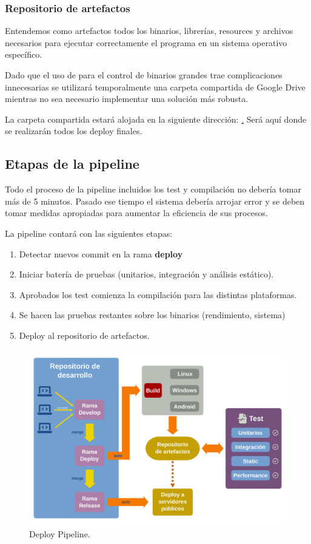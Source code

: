 \subsubsection{Repositorio de artefactos}

Entendemos como artefactos todos los binarios, librerías, resources y archivos necesarios para ejecutar correctamente el programa en un sistema operativo específico.

Dado que el uso de  para el control de binarios grandes trae complicaciones innecesarias se utilizará temporalmente una carpeta compartida de Google Drive mientras no sea necesario implementar una solución más robusta.

La carpeta compartida estará alojada en la siguiente dirección: \href{https://drive.google.com/drive/folders/15OtN9fs-UASOKTRcWGbR-knWMSmQGyO_?usp=sharing}. Será aquí donde se realizarán todos los deploy finales.

\subsection{Etapas de la pipeline}

Todo el proceso de la pipeline incluidos los test y compilación no debería tomar más de 5 minutos. Pasado ese tiempo el sistema debería arrojar error y se deben tomar medidas apropiadas para aumentar la eficiencia de sus procesos.

La pipeline contará con las siguientes etapas:

\begin{enumerate}
    \item Detectar nuevos commit en la rama \textbf{deploy}
    \item Iniciar batería de pruebas (unitarios, integración y análisis estático).
    \item Aprobados los test comienza la compilación para las distintas plataformas.
    \item Se hacen las pruebas restantes sobre los binarios (rendimiento, sistema)
    \item Deploy al repositorio de artefactos.
\end{enumerate}

\begin{figure}[ht]
	\centering
	\includegraphics[width=\textwidth]{images/pipeline.png}
	\caption{Deploy Pipeline.}
\end{figure}

